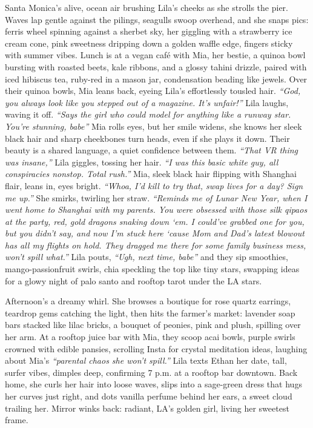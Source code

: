 \documentclass[12pt]{article}
\begin{document}
Santa Monica’s alive, ocean air brushing Lila’s cheeks as she strolls the pier. Waves lap gentle against the pilings, seagulls swoop overhead, and she snaps pics: ferris wheel spinning against a sherbet sky, her giggling with a strawberry ice cream cone, pink sweetness dripping down a golden waffle edge, fingers sticky with summer vibes. Lunch is at a vegan café with Mia, her bestie, a quinoa bowl bursting with roasted beets, kale ribbons, and a glossy tahini drizzle, paired with iced hibiscus tea, ruby-red in a mason jar, condensation beading like jewels. Over their quinoa bowls, Mia leans back, eyeing Lila’s effortlessly tousled hair. \textit{“God, you always look like you stepped out of a magazine. It’s unfair!”} Lila laughs, waving it off. \textit{“Says the girl who could model for anything like a runway star. You’re stunning, babe”} Mia rolls eyes, but her smile widens, she knows her sleek black hair and sharp cheekbones turn heads, even if she plays it down. Their beauty is a shared language, a quiet confidence between them. \textit{“That VR thing was insane,”} Lila giggles, tossing her hair. \textit{“I was this basic white guy, all conspiracies nonstop. Total rush.”} Mia, sleek black hair flipping with Shanghai flair, leans in, eyes bright. \textit{“Whoa, I’d kill to try that, swap lives for a day? Sign me up.”} She smirks, twirling her straw. \textit{“Reminds me of Lunar New Year, when I went home to Shanghai with my parents. You were obsessed with those silk qipaos at the party, red, gold dragons snaking down ‘em. I could’ve grabbed one for you, but you didn’t say, and now I’m stuck here ‘cause Mom and Dad’s latest blowout has all my flights on hold. They dragged me there for some family business mess, won’t spill what.”} Lila pouts, \textit{“Ugh, next time, babe”} and they sip smoothies, mango-passionfruit swirls, chia speckling the top like tiny stars, swapping ideas for a glowy night of palo santo and rooftop tarot under the LA stars.

Afternoon’s a dreamy whirl. She browses a boutique for rose quartz earrings, teardrop gems catching the light, then hits the farmer’s market: lavender soap bars stacked like lilac bricks, a bouquet of peonies, pink and plush, spilling over her arm. At a rooftop juice bar with Mia, they scoop acai bowls, purple swirls crowned with edible pansies, scrolling Insta for crystal meditation ideas, laughing about Mia’s \textit{“parental chaos she won’t spill.”} Lila texts Ethan her date, tall, surfer vibes, dimples deep, confirming 7 p.m. at a rooftop bar downtown. Back home, she curls her hair into loose waves, slips into a sage-green dress that hugs her curves just right, and dots vanilla perfume behind her ears, a sweet cloud trailing her. Mirror winks back: radiant, LA’s golden girl, living her sweetest frame.
\end{document}
